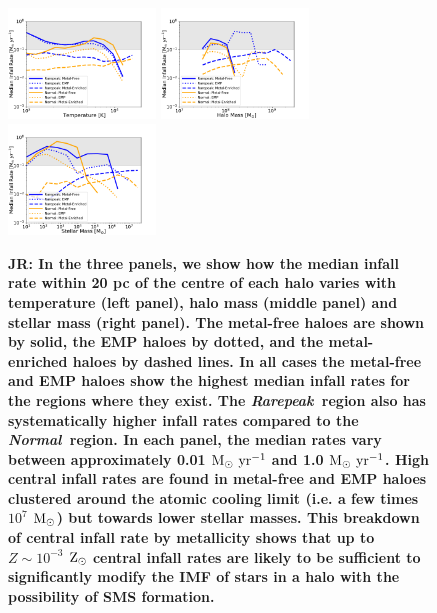 \documentclass[twocolumn,iop,revtex4]{openjournal}
\newcommand{\msolarc} {$\rm{M_{\odot}}$}
\newcommand{\msolaryr} {$\rm{M_{\odot}~yr^{-1}}~$}
\newcommand{\msolaryrc} {$\rm{M_{\odot}~yr^{-1}}$}
\newcommand{\zsolar} {$\rm{Z_{\odot}}~$}
\newcommand{\rarepeak} {\textit{Rarepeak~}}
\newcommand{\normal} {\textit{Normal~}}
\def\jr#1{{\color{blue} \bf JR:  #1}}
\begin{document}
\begin{figure}
\centering
\begin{minipage}{175mm}      \begin{center} 
\centerline{
\includegraphics[width=0.35\textwidth]{FIGURES/BinnedTemperature.pdf}
\includegraphics[width=0.35\textwidth]{FIGURES/BinnedHaloMass.pdf}
\includegraphics[width=0.35\textwidth]{FIGURES/BinnedStellarMass.pdf}}
\caption{\jr{In the three panels, we show how the median infall rate within 20 pc of the centre of each halo
  varies with temperature (left panel), halo mass (middle panel) and stellar mass (right panel). The metal-free
  haloes are shown by solid, the EMP haloes by dotted, and the metal-enriched haloes by dashed lines.
  In all cases the metal-free and EMP haloes show the highest median infall rates for the regions where they
  exist. The \rarepeak region also has systematically higher infall rates compared to the \normal region.
  In each panel, the median rates vary between approximately 0.01 \msolaryr and 1.0 \msolaryrc. High
  central infall rates are found in metal-free and EMP haloes clustered around the atomic cooling limit (i.e.
  a few times $10^7$ \msolarc) but towards lower stellar masses. This breakdown of central infall rate
  by metallicity shows that up to $Z \sim 10^{-3}$ \zsolar central infall rates are likely to be sufficient
  to significantly modify the IMF of stars in a halo with the possibility of SMS formation.
 \label{Fig:BinnedMedianInfall}}}
\end{center} \end{minipage}

\end{figure}
\end{document}
